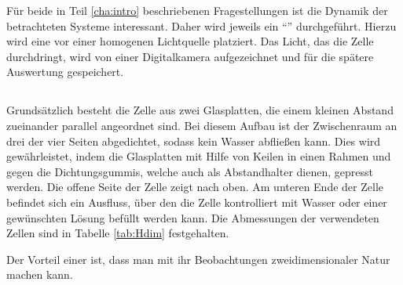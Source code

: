 \label{cha:set}


Für beide in Teil \ref{cha:intro} beschriebenen Fragestellungen ist die Dynamik der betrachteten Systeme interessant. Daher wird jeweils ein ``\LTM'' durchgeführt. Hierzu wird eine \HSC vor einer homogenen Lichtquelle platziert. Das Licht, das die Zelle durchdringt, wird von einer Digitalkamera aufgezeichnet und für die spätere Auswertung gespeichert.

\subsection{\HSC}
\label{sec:hsc}
Grundsätzlich besteht die Zelle aus zwei Glasplatten, die einem kleinen Abstand zueinander parallel angeordnet sind. Bei diesem Aufbau ist der Zwischenraum an drei der vier Seiten abgedichtet, sodass kein Wasser abfließen kann. Dies wird gewährleistet, indem die Glasplatten mit Hilfe von Keilen in einen Rahmen und gegen die Dichtungsgummis, welche auch als Abstandhalter dienen, gepresst werden. 
Die offene Seite der Zelle zeigt nach oben. Am unteren Ende der Zelle befindet sich ein Ausfluss, über den die Zelle kontrolliert mit Wasser oder einer gewünschten Lösung befüllt werden kann.
Die Abmessungen der verwendeten Zellen sind in Tabelle \ref{tab:Hdim} festgehalten.


Der Vorteil einer \HSC ist, dass man mit ihr Beobachtungen zweidimensionaler Natur machen kann.


